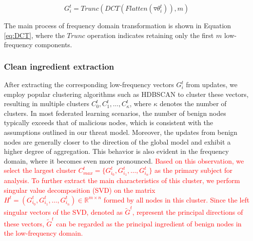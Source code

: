 \documentclass[lettersize,journal]{IEEEtran}
\begin{document}
\begin{equation}
G_i^t = Trunc(DCT(Flatten(\triangledown \theta_i^t)), m)
\label{eq:DCT}
\end{equation}

The main process of frequency domain transformation is shown in Equation \ref{eq:DCT}, where the $Trunc$ operation indicates retaining only the first $m$ low-frequency components.

\subsubsection{Clean ingredient extraction}
After extracting the corresponding low-frequency vectors \(G_i^t\) from updates, we employ popular clustering algorithms such as HDBSCAN \cite{mcinnes2017hdbscan} to cluster these vectors, resulting in multiple clusters \(C_0^t, C_1^t, \ldots, C_{\kappa}^t\), where \(\kappa\) denotes the number of clusters. In most federated learning scenarios, the number of benign nodes typically exceeds that of malicious nodes, which is consistent with the assumptions outlined in our threat model. Moreover, the updates from benign nodes are generally closer to the direction of the global model and exhibit a higher degree of aggregation. This behavior is also evident in the frequency domain, where it becomes even more pronounced. 
\textcolor{red}{Based on this observation, we select the largest cluster \(C^t_{max} = \{G^t_{i_0}, G^t_{i_1}, \ldots, G^t_{i_n}\}\) as the primary subject for analysis. To further extract the main characteristics of this cluster, we perform singular value decomposition (SVD)\cite{wang2023scfl} on the matrix $H^t = (G^t_{i_0}, G^t_{i_1}, \ldots, G^t_{i_n}) \in \mathbb{R}^{m \times n}$ formed by all nodes in this cluster. Since the left singular vectors of the SVD, denoted as \(\tilde{G}^t\), represent the principal directions of these vectors, \(\tilde{G}^t\) can be regarded as the principal ingredient of benign nodes in the low-frequency domain.}
\end{document}
